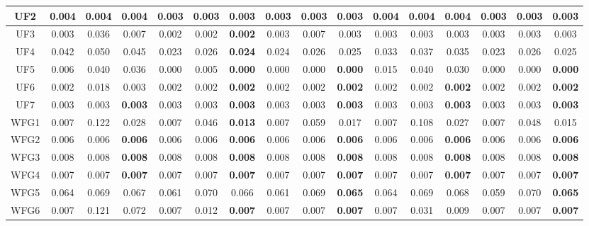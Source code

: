 \begin{table}[]
{\begin{tabular}{c|c|c|c|c|c|c|c|c|c|c|c|c|c|c|c|}
\multicolumn{1}{|c|}{UF2} & 0.004 & 0.004 & 0.004 & 0.003 & 0.003 & \textbf{0.003} & 0.003 & 0.003 & \textbf{0.003} & 0.004 & 0.004 & 0.004 & 0.003 & 0.003 & \textbf{0.003} \\ \hline
\multicolumn{1}{|c|}{UF3} & 0.003 & 0.036 & 0.007 & 0.002 & 0.002 & \textbf{0.002} & 0.003 & 0.007 & 0.003 & 0.003 & 0.003 & 0.003 & 0.003 & 0.003 & 0.003 \\ \hline
\multicolumn{1}{|c|}{UF4} & 0.042 & 0.050 & 0.045 & 0.023 & 0.026 & \textbf{0.024} & 0.024 & 0.026 & 0.025 & 0.033 & 0.037 & 0.035 & 0.023 & 0.026 & 0.025 \\ \hline
\multicolumn{1}{|c|}{UF5} & 0.006 & 0.040 & 0.036 & 0.000 & 0.005 & \textbf{0.000} & 0.000 & 0.000 & \textbf{0.000} & 0.015 & 0.040 & 0.030 & 0.000 & 0.000 & \textbf{0.000} \\ \hline
\multicolumn{1}{|c|}{UF6} & 0.002 & 0.018 & 0.003 & 0.002 & 0.002 & \textbf{0.002} & 0.002 & 0.002 & \textbf{0.002} & 0.002 & 0.002 & \textbf{0.002} & 0.002 & 0.002 & \textbf{0.002} \\ \hline
\multicolumn{1}{|c|}{UF7} & 0.003 & 0.003 & \textbf{0.003} & 0.003 & 0.003 & \textbf{0.003} & 0.003 & 0.003 & \textbf{0.003} & 0.003 & 0.003 & \textbf{0.003} & 0.003 & 0.003 & \textbf{0.003} \\ \hline
\multicolumn{1}{|c|}{WFG1} & 0.007 & 0.122 & 0.028 & 0.007 & 0.046 & \textbf{0.013} & 0.007 & 0.059 & 0.017 & 0.007 & 0.108 & 0.027 & 0.007 & 0.048 & 0.015 \\ \hline
\multicolumn{1}{|c|}{WFG2} & 0.006 & 0.006 & \textbf{0.006} & 0.006 & 0.006 & \textbf{0.006} & 0.006 & 0.006 & \textbf{0.006} & 0.006 & 0.006 & \textbf{0.006} & 0.006 & 0.006 & \textbf{0.006} \\ \hline
\multicolumn{1}{|c|}{WFG3} & 0.008 & 0.008 & \textbf{0.008} & 0.008 & 0.008 & \textbf{0.008} & 0.008 & 0.008 & \textbf{0.008} & 0.008 & 0.008 & \textbf{0.008} & 0.008 & 0.008 & \textbf{0.008} \\ \hline
\multicolumn{1}{|c|}{WFG4} & 0.007 & 0.007 & \textbf{0.007} & 0.007 & 0.007 & \textbf{0.007} & 0.007 & 0.007 & \textbf{0.007} & 0.007 & 0.007 & \textbf{0.007} & 0.007 & 0.007 & \textbf{0.007} \\ \hline
\multicolumn{1}{|c|}{WFG5} & 0.064 & 0.069 & 0.067 & 0.061 & 0.070 & 0.066 & 0.061 & 0.069 & \textbf{0.065} & 0.064 & 0.069 & 0.068 & 0.059 & 0.070 & \textbf{0.065} \\ \hline
\multicolumn{1}{|c|}{WFG6} & 0.007 & 0.121 & 0.072 & 0.007 & 0.012 & \textbf{0.007} & 0.007 & 0.007 & \textbf{0.007} & 0.007 & 0.031 & 0.009 & 0.007 & 0.007 & \textbf{0.007} \\ \hline

\end{tabular}}
\end{table}

